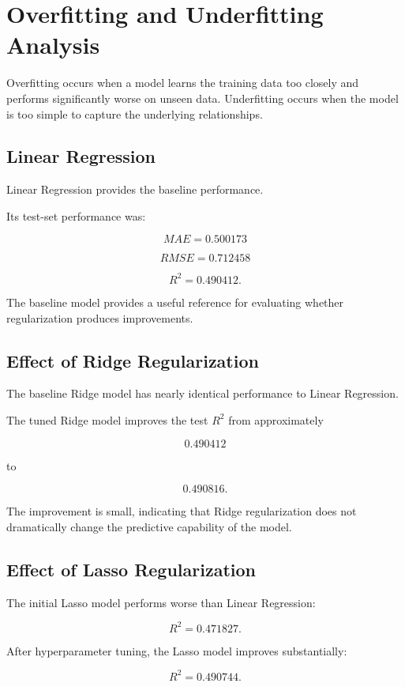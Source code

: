\documentclass[12pt,a4paper]{article}
\begin{document}
\section{Overfitting and Underfitting Analysis}

Overfitting occurs when a model learns the training data too closely and
performs significantly worse on unseen data. Underfitting occurs when the
model is too simple to capture the underlying relationships.

\subsection{Linear Regression}

Linear Regression provides the baseline performance.

Its test-set performance was:

\[
MAE=0.500173
\]

\[
RMSE=0.712458
\]

\[
R^2=0.490412.
\]

The baseline model provides a useful reference for evaluating whether
regularization produces improvements.

\subsection{Effect of Ridge Regularization}

The baseline Ridge model has nearly identical performance to Linear
Regression.

The tuned Ridge model improves the test $R^2$ from approximately

\[
0.490412
\]

to

\[
0.490816.
\]

The improvement is small, indicating that Ridge regularization does not
dramatically change the predictive capability of the model.

\subsection{Effect of Lasso Regularization}

The initial Lasso model performs worse than Linear Regression:

\[
R^2=0.471827.
\]

After hyperparameter tuning, the Lasso model improves substantially:

\[
R^2=0.490744.
\]
\end{document}
